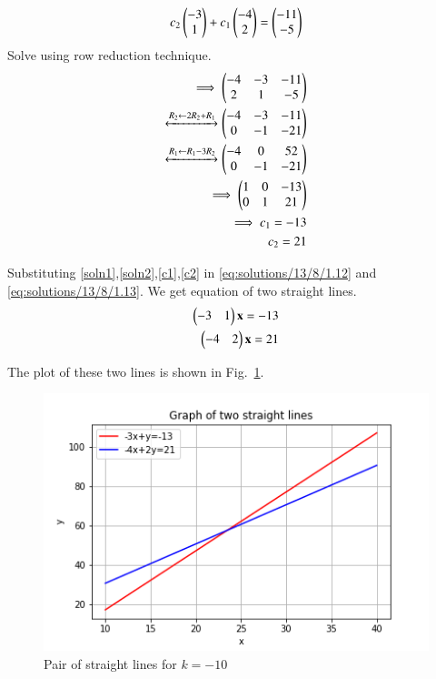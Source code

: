 \begin{align}
    c_2\begin{pmatrix}-3\\1\end{pmatrix}+c_1\begin{pmatrix}-4\\2\end{pmatrix}=\begin{pmatrix} -11\\ -5\end{pmatrix}
\end{align}
Solve using row reduction technique.
\begin{align}
    \implies\begin{pmatrix}-4 & -3 & -11\\2 & 1 & -5\end{pmatrix}\\
    \xleftrightarrow[]{R_2\leftarrow 2R_2+R_1}\begin{pmatrix}-4 & -3 & -11\\0 & -1 & -21\end{pmatrix}\\
    \xleftrightarrow[]{R_1\leftarrow R_1-3R_2}\begin{pmatrix}-4 & 0 & 52\\0 & -1 & -21\end{pmatrix}\\
    \implies\begin{pmatrix}1 & 0 & -13\\0 & 1 & 21\end{pmatrix}\\
    \implies c_1=-13\label{c1}\\
    c_2=21\label{c2}
\end{align}

Substituting \eqref{soln1},\eqref{soln2},\eqref{c1},\eqref{c2} in \eqref{eq:solutions/13/8/1.12} and \eqref{eq:solutions/13/8/1.13}. We get equation of two straight lines.
\begin{align}
    \begin{pmatrix}-3 & 1\end{pmatrix}\mathbf{x}=-13\\
    \begin{pmatrix}-4 & 2\end{pmatrix}\mathbf{x}=21
\end{align}

The plot of these two lines is shown in Fig.~\ref{fig:solutions/13/8/figure1}.
\begin{figure}[ht!]
    \centering
    \includegraphics[width=\columnwidth]{./solutions/13/8/Figure1}
    \caption{Pair of straight lines for $k=-10$}
    \label{fig:solutions/13/8/figure1}
\end{figure}

